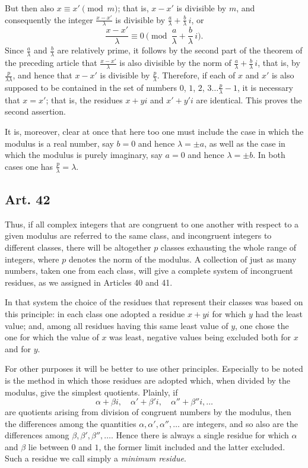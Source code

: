 \documentclass[12pt]{article}
\newcommand{\art}[1]{\subsection*{Art. #1}}
\begin{document}
But then also $x\equiv x' \pmod{m}$; that is, $x-x'$ is divisible by $m$, and consequently the integer $\frac{x-x'}{\lambda}$ is divisible by $\frac{a}{\lambda}+\frac{b}{\lambda}\,i$, or
\[
\frac{x-x'}{\lambda}\equiv 0\pmod{\frac{a}{\lambda}+\frac{b}{\lambda}\,i}.
\]
Since $\frac{a}{\lambda}$ and $\frac{b}{\lambda}$ are relatively prime, it follows by the second part of the theorem of the preceding article that $\frac{x-x'}{\lambda}$ is also divisible by the norm of $\frac{a}{\lambda}+\frac{b}{\lambda}\,i$, that is, by $\frac{p}{\lambda\lambda}$, and hence that $x-x'$ is divisible by $\frac{p}{\lambda}$. Therefore, if each of $x$ and $x'$ is also supposed to be contained in the set of numbers $0$, $1$, $2$, $3\ldots \frac{p}{\lambda}-1$, it is necessary that $x=x'$; that is, the residues $x+yi$ and $x'+y'i$ are identical. This proves the second assertion.

It is, moreover, clear at once that here too one must include the case in which the modulus is a real number, say $b=0$ and hence $\lambda=\pm a$, as well as the case in which the modulus is purely imaginary, say $a=0$ and hence $\lambda=\pm b$. In both cases one has $\frac{p}{\lambda}=\lambda$.

\art{42}
Thus, if all complex integers that are congruent to one another with respect to a given modulus are referred to the same class, and incongruent integers to different classes, there will be altogether $p$ classes exhausting the whole range of integers, where $p$ denotes the norm of the modulus. A collection of just as many numbers, taken one from each class, will give a complete system of incongruent residues, as we assigned in Articles 40 and 41.

In that system the choice of the residues that represent their classes was based on this principle: in each class one adopted a residue $x+yi$ for which $y$ had the least value; and, among all residues having this same least value of $y$, one chose the one for which the value of $x$ was least, negative values being excluded both for $x$ and for $y$.

For other purposes it will be better to use other principles. Especially to be noted is the method in which those residues are adopted which, when divided by the modulus, give the simplest quotients. Plainly, if
\[
\alpha+\beta i,\quad \alpha'+\beta'i,\quad \alpha''+\beta''i,\ldots
\]
are quotients arising from division of congruent numbers by the modulus, then the differences among the quantities $\alpha,\alpha',\alpha'',\ldots$ are integers, and so also are the differences among $\beta,\beta',\beta'',\ldots$. Hence there is always a single residue for which $\alpha$ and $\beta$ lie between $0$ and $1$, the former limit included and the latter excluded. Such a residue we call simply a \emph{minimum residue}.
\end{document}
